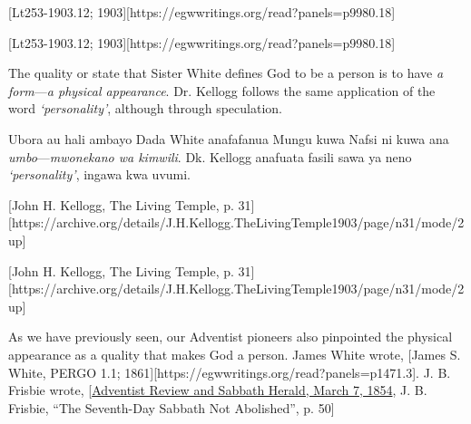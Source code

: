 [Lt253-1903.12; 1903][https://egwwritings.org/read?panels=p9980.18]


[Lt253-1903.12; 1903][https://egwwritings.org/read?panels=p9980.18]


The quality or state that Sister White defines God to be a person is to have \textit{a form}—\textit{a physical appearance}. Dr. Kellogg follows the same application of the word \textit{‘personality’}, although through speculation.


Ubora au hali ambayo Dada White anafafanua Mungu kuwa Nafsi ni kuwa ana \textit{umbo}—\textit{mwonekano wa kimwili}. Dk. Kellogg anafuata fasili sawa ya neno \textit{‘personality’}, ingawa kwa uvumi.


[John H. Kellogg, The Living Temple, p. 31][https://archive.org/details/J.H.Kellogg.TheLivingTemple1903/page/n31/mode/2up]


[John H. Kellogg, The Living Temple, p. 31][https://archive.org/details/J.H.Kellogg.TheLivingTemple1903/page/n31/mode/2up]


As we have previously seen, our Adventist pioneers also pinpointed the physical appearance as a quality that makes God a person. James White wrote, [James S. White, PERGO 1.1; 1861][https://egwwritings.org/read?panels=p1471.3]. J. B. Frisbie wrote, [\href{https://documents.adventistarchives.org/Periodicals/RH/RH18540307-V05-07.pdf}{Adventist Review and Sabbath Herald, March 7, 1854}, J. B. Frisbie, “The Seventh-Day Sabbath Not Abolished”, p. 50]



